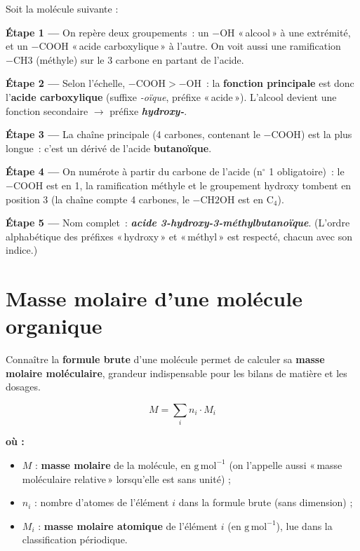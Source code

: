 \documentclass[11pt,a4paper]{article}
\newenvironment{ou}{%
  \par\smallskip\noindent\textbf{où :}\nopagebreak
  \begin{itemize}[leftmargin=1.8em,topsep=2pt,itemsep=1.5pt,parsep=0pt]}%
  {\end{itemize}}
\begin{document}
\begin{exemple}
Soit la molécule suivante :
\begin{center}\end{center}
\textbf{Étape 1 —} On repère deux groupements~: un $-\text{OH}$ «\,alcool\,» à une extrémité, et un $-\text{COOH}$ «\,acide carboxylique\,» à l'autre. On voit aussi une ramification $-\text{CH3}$ (méthyle) sur le 3 carbone en partant de l'acide.

\textbf{Étape 2 —} Selon l'échelle, $-\text{COOH} > -\text{OH}$~: la \textbf{fonction principale} est donc l'\textbf{acide carboxylique} (suffixe \textit{-oïque}, préfixe «\,acide\,»). L'alcool devient une fonction secondaire $\rightarrow$ préfixe \textbf{\textit{hydroxy-}}.

\textbf{Étape 3 —} La chaîne principale (4 carbones, contenant le $-\text{COOH}$) est la plus longue~: c'est un dérivé de l'acide \textbf{butanoïque}.

\textbf{Étape 4 —} On numérote à partir du carbone de l'acide (n$^\circ$ 1 obligatoire)~: le $-\text{COOH}$ est en 1, la ramification méthyle et le groupement hydroxy tombent en position 3 (la chaîne compte 4 carbones, le $-\text{CH2OH}$ est en C$_4$).

\textbf{Étape 5 —} Nom complet~: \textbf{\textit{acide 3-hydroxy-3-méthylbutanoïque}}. (L'ordre alphabétique des préfixes «\,hydroxy\,» et «\,méthyl\,» est respecté, chacun avec son indice.)
\end{exemple}

\section{Masse molaire d'une molécule organique}
Connaître la \textbf{formule brute} d'une molécule permet de calculer sa \textbf{masse molaire moléculaire}, grandeur indispensable pour les bilans de matière et les dosages.

\begin{formule}
\[
\boxed{\;M = \sum_{i} n_i \cdot M_i\;}
\]
\begin{ou}
  \item $M$ : \textbf{masse molaire} de la molécule, en $\mathrm{g\,mol^{-1}}$ (on l'appelle aussi «\,masse moléculaire relative\,» lorsqu'elle est sans unité) ;
  \item $n_i$ : nombre d'atomes de l'élément $i$ dans la formule brute (sans dimension) ;
  \item $M_i$ : \textbf{masse molaire atomique} de l'élément $i$ (en $\mathrm{g\,mol^{-1}}$), lue dans la classification périodique.
\end{ou}
\end{formule}
\end{document}
